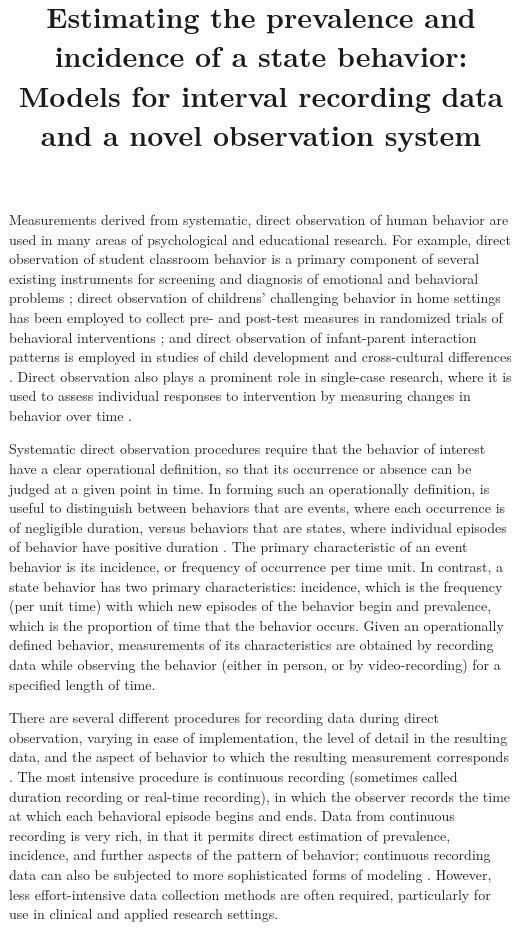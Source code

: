 \documentclass[man, noextraspace, floatsintext]{apa6}\usepackage[]{graphicx}\usepackage[]{color}
\title{Estimating the prevalence and incidence of a state behavior: Models for interval recording data and a novel observation system}
\begin{document}
\maketitle

Measurements derived from systematic, direct observation of human behavior are used in many areas of psychological and educational research. 
For example, direct observation of student classroom behavior is a primary component of several existing instruments for screening and diagnosis of emotional and behavioral problems \citep{Volpe2005observing}; direct observation of childrens' challenging behavior in home settings has been employed to collect pre- and post-test measures in randomized trials of behavioral interventions \citep[e.g.,][]{Durand2012positive}; and direct observation of infant-parent interaction patterns is employed in studies of child development \citep{Mann1991time} and cross-cultural differences \citep{Bornstein2002measurement}. 
Direct observation also plays a prominent role in single-case research, where it is used to assess individual responses to intervention by measuring changes in behavior over time \citep{Kazdin2011single}.

Systematic direct observation procedures require that the behavior of interest have a clear operational definition, so that its occurrence or absence can be judged at a given point in time. 
In forming such an operationally definition, is useful to distinguish between behaviors that are events, where each occurrence is of negligible duration, versus behaviors that are states, where individual episodes of behavior have positive duration \citep{Altmann1974observational}. 
The primary characteristic of an event behavior is its incidence, or frequency of occurrence per time unit. 
In contrast, a state behavior has two primary characteristics: incidence, which is the frequency (per unit time) with which new episodes of the behavior begin and prevalence, which is the proportion of time that the behavior occurs. Given an operationally defined behavior, measurements of its characteristics are obtained by recording data while observing the behavior (either in person, or by video-recording) for a specified length of time. 

There are several different procedures for recording data during direct observation, varying in ease of implementation, the level of detail in the resulting data, and the aspect of behavior to which the resulting measurement corresponds \citep[for surveys of major recording procedures, see][]{Altmann1974observational, Ayres2010dependent, Hartmann1990observational, Primavera1996measurement}. 
The most intensive procedure is continuous recording (sometimes called duration recording or real-time recording), in which the observer records the time at which each behavioral episode begins and ends.
Data from continuous recording is very rich, in that it permits direct estimation of prevalence, incidence, and further aspects of the pattern of behavior; continuous recording data can also be subjected to more sophisticated forms of modeling \citep[e.g.,][]{Bakeman2011sequential, Haccou1992statistical}. 
However, less effort-intensive data collection methods are often required, particularly for use in clinical and applied research settings. 
\end{document}

